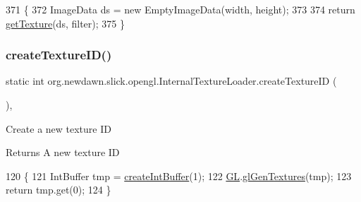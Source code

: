 \begin{DoxyCode}
371                                                                                                          \{
372         ImageData ds = \textcolor{keyword}{new} EmptyImageData(width, height);
373         
374         \textcolor{keywordflow}{return} \mbox{\hyperlink{classorg_1_1newdawn_1_1slick_1_1opengl_1_1_internal_texture_loader_a5d76355a0aa7c2b3d7dd6106412d5805}{getTexture}}(ds, filter);
375     \}
\end{DoxyCode}
\mbox{\label{classorg_1_1newdawn_1_1slick_1_1opengl_1_1_internal_texture_loader_a1bebab39014659d66c3f45bfefb678a1}} 
\subsubsection{\texorpdfstring{create\+Texture\+I\+D()}{createTextureID()}}
{\footnotesize\ttfamily static int org.\+newdawn.\+slick.\+opengl.\+Internal\+Texture\+Loader.\+create\+Texture\+ID (\begin{DoxyParamCaption}{ }\end{DoxyParamCaption})\hspace{0.3cm}{\ttfamily [inline]}, {\ttfamily [static]}}

Create a new texture ID

\begin{DoxyReturn}{Returns}
A new texture ID 
\end{DoxyReturn}

\begin{DoxyCode}
120     \{ 
121        IntBuffer tmp = \mbox{\hyperlink{classorg_1_1newdawn_1_1slick_1_1opengl_1_1_internal_texture_loader_a395abad35456c2a752fbca089d209981}{createIntBuffer}}(1); 
122        \mbox{\hyperlink{classorg_1_1newdawn_1_1slick_1_1opengl_1_1_internal_texture_loader_a302f0e97810ce583189425dd693ae4c2}{GL}}.\mbox{\hyperlink{interfaceorg_1_1newdawn_1_1slick_1_1opengl_1_1renderer_1_1_s_g_l_ab3f3f950cf59599784f17a0d19667829}{glGenTextures}}(tmp); 
123        \textcolor{keywordflow}{return} tmp.get(0);
124     \} 
\end{DoxyCode}
\mbox{\label{classorg_1_1newdawn_1_1slick_1_1opengl_1_1_internal_texture_loader_a01691a541caf71ca7f1daeac7defea02}} 
